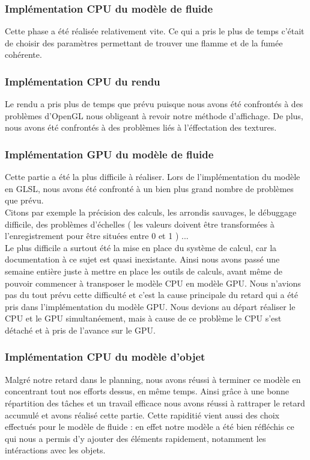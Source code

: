 \documentclass[a4paper,10pt]{article}
\begin{document}
\subsubsection{Implémentation CPU du modèle de fluide}
Cette phase a été réalisée relativement vite. Ce qui a pris le plus de temps c'était de choisir des paramètres
permettant de trouver une flamme et de la fumée cohérente.

\subsubsection{Implémentation CPU du rendu}
Le rendu a pris plus de temps que prévu puisque nous avons été confrontés à des problèmes d'OpenGL nous obligeant à revoir 
notre méthode d'affichage. De plus, nous avons été confrontés à des problèmes liés à l'éffectation des textures. 


\subsubsection{Implémentation GPU du modèle de fluide}
Cette partie a été la plus difficile à réaliser. Lors de l'implémentation du modèle en GLSL, nous avons été
confronté à un bien plus grand nombre de problèmes que prévu. \\
Citons par exemple la précision des calculs, les arrondis sauvages, le débuggage difficile, des problèmes d'échelles ( les valeurs doivent être transformées à l'enregistrement pour être situées entre 0 et 1 ) ...\\
Le plus difficile a surtout été la mise en place du système de calcul, car la documentation à ce sujet est quasi inexistante. Ainsi nous avons passé une semaine entière juste à mettre en place les outils de calculs, avant même de pouvoir commencer à transposer le modèle CPU en modèle GPU. Nous n'avions pas du tout prévu cette difficulté et c'est la cause principale du retard qui a été pris dans l'implémentation du modèle GPU. Nous devions au départ réaliser le CPU et le GPU simultanéement,
mais à cause de ce problème le CPU s'est détaché et à pris de l'avance sur le GPU.



\subsubsection{Implémentation CPU du modèle d'objet}
Malgré notre retard dans le planning, nous avons réussi à terminer ce modèle en concentrant tout nos
efforts dessus, en même temps. Ainsi grâce à une bonne répartition des tâches et
un travail efficace nous avons réussi à rattraper le retard accumulé et avons réalisé
cette partie. Cette rapiditié vient aussi des choix effectués pour le modèle de fluide :
en effet notre modèle a été bien réfléchis ce qui nous a permis d'y ajouter des éléments
rapidement, notamment les intéractions avec les objets.
\end{document}
